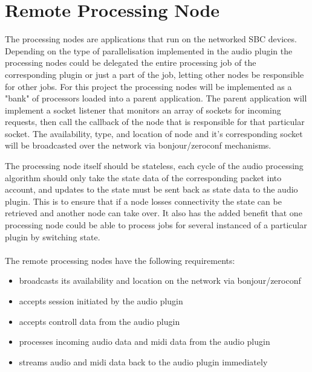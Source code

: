 \section{Remote Processing Node}

The processing nodes are applications that run on the networked SBC devices. Depending on the type of parallelisation implemented in the audio plugin the processing nodes could be delegated the entire processing job of the corresponding plugin or just a part of the job, letting other nodes be responsible for other jobs. For this project the processing nodes will be implemented as a "bank" of processors loaded into a parent application. The parent application will implement a socket listener that monitors an array of sockets for incoming requests, then call the callback of the node that is responsible for that particular socket. The availability, type, and location of node and it's corresponding socket will be broadcasted over the network via bonjour/zeroconf mechanisms.

The processing node itself should be stateless, each cycle of the audio processing algorithm should only take the state data of the corresponding packet into account, and updates to the state must be sent back as state data to the audio plugin. This is to ensure that if a node losses connectivity the state can be retrieved and another node can take over. It also has the added benefit that one processing node could be able to process jobs for several instanced of a particular plugin by switching state.\\
\\
\noindent
The remote processing nodes have the following requirements:

\begin{itemize}

\item broadcasts its availability and location on the network via bonjour/zeroconf
\item accepts session initiated by the audio plugin
\item accepts controll data from the audio plugin
\item processes incoming audio data and midi data from the audio plugin
\item streams audio and midi data back to the audio plugin immediately

\end{itemize}
